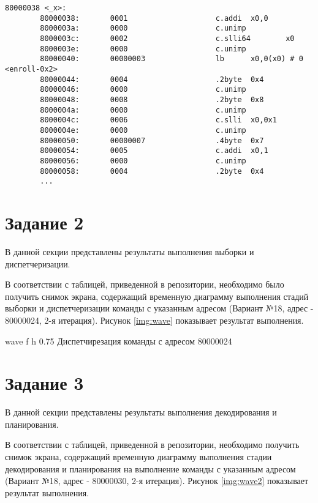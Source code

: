 \begin{lstlisting}[style=asm, caption=Дизассемблированный код программы для задания 1, label=lst:task1_disasm]
        80000038 <_x>:
        80000038:       0001                    c.addi  x0,0
        8000003a:       0000                    c.unimp
        8000003c:       0002                    c.slli64        x0
        8000003e:       0000                    c.unimp
        80000040:       00000003                lb      x0,0(x0) # 0 <enroll-0x2>
        80000044:       0004                    .2byte  0x4
        80000046:       0000                    c.unimp
        80000048:       0008                    .2byte  0x8
        8000004a:       0000                    c.unimp
        8000004c:       0006                    c.slli  x0,0x1
        8000004e:       0000                    c.unimp
        80000050:       00000007                .4byte  0x7
        80000054:       0005                    c.addi  x0,1
        80000056:       0000                    c.unimp
        80000058:       0004                    .2byte  0x4
        ...
\end{lstlisting}
\clearpage

\section{Задание 2}

В данной секции представлены результаты выполнения выборки и диспетчеризации.\newline

В соответствии с таблицей, приведенной в репозитории, необходимо было получить снимок экрана, содержащий
временную диаграмму выполнения стадий выборки и диспетчеризации команды с
указанным адресом (Вариант №18, адрес - 80000024, 2-я итерация). Рисунок \ref{img:wave} показывает результат выполнения.

{wave} %
{f} %
{h} %
{0.75\textwidth} %
{Диспетчирезация команды с адресом 80000024} %
\clearpage

\section{Задание 3}

В данной секции представлены результаты выполнения декодирования и планирования.\newline

В соответствии с таблицей, приведенной в репозитории, необходимо получить снимок экрана, содержащий
временную диаграмму выполнения стадии декодирования и планирования на выполнение
команды с указанным адресом (Вариант №18, адрес - 80000030, 2-я итерация).
Рисунок \ref{img:wave2} показывает результат выполнения.

